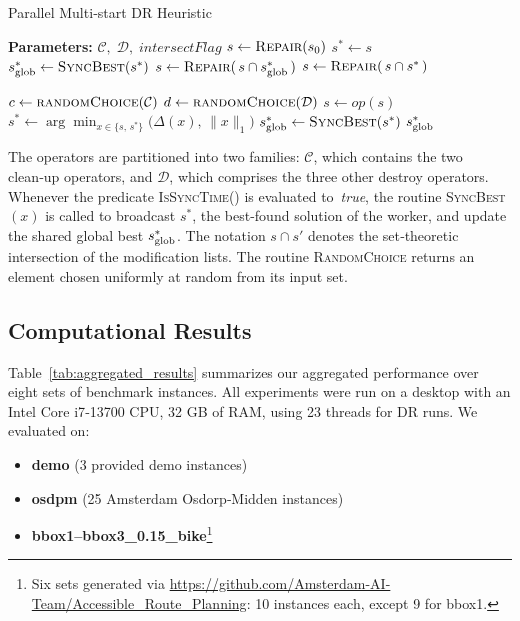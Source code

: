 \documentclass{article}
\begin{document}
\begin{algorithm}[H]
  \caption{Parallel Multi‐start DR Heuristic}
  \label{alg:msdr}
  \begin{algorithmic}[1]
      \State \textbf{Parameters:} $\mathcal C,\;\mathcal D,\;\textit{intersectFlag}$
      \State $s \gets \Call{Repair}{s_0}$ 
      \State $ s^* \gets s$ 
          \State $s_{\rm glob}^* \gets \Call{SyncBest}{s^*}$
            \State $s \gets \Call{Repair}{\,s \cap s_{\rm glob}^*\,}$
           \Else
            \State $s \gets \Call{Repair}{\,s \cap s^*\,}$
          \EndIf
        \EndIf

        \State $c \gets \Call{randomChoice}{\mathcal C}$   
        \State $d \gets \Call{randomChoice}{\mathcal D}$   
          \State $s \gets op(s)$
          \State $s^* \gets \displaystyle
            \arg\min_{x \in \{s,\,s^*\}}
              \bigl(\Delta(x),\,\|x\|_1\bigr)$
        \EndFor
      \EndWhile
      \State $s_{\rm glob}^* \gets \Call{SyncBest}{s^*}$
      \State \Return $s_{\rm glob}^*$
    \EndFunction
  \end{algorithmic}
\end{algorithm}

The operators are partitioned into two families: $\mathcal{C}$, which contains the two clean‑up operators, and $\mathcal{D}$, which comprises the three other destroy operators. Whenever the predicate \textsc{IsSyncTime}() is evaluated to~\emph{true}, the routine \textsc{SyncBest}$(x)$ is called to broadcast $s^*$, the best-found solution of the worker, and update the shared global best $s_{\rm glob}^*$. The notation $s \cap s'$ denotes the set‑theoretic intersection of the modification lists. The routine \textsc{RandomChoice} returns an element chosen uniformly at random from its input set.




\subsection{Computational Results}
\label{sec:experiments}

Table~\ref{tab:aggregated_results} summarizes our aggregated performance over eight sets of benchmark instances.  All experiments were run on a desktop with an Intel Core i7‑13700 CPU, 32 GB of RAM, using 23 threads for DR runs.
We evaluated on:
\begin{itemize}
  \item \textbf{demo} (3 provided demo instances)
  \item \textbf{osdpm} (25 Amsterdam Osdorp‑Midden instances)
  \item \textbf{bbox1–bbox3\_0.15\_bike}\footnote{Six sets generated via \url{https://github.com/Amsterdam-AI-Team/Accessible_Route_Planning}: 10 instances each, except 9 for bbox1.}
\end{itemize}
\end{document}
